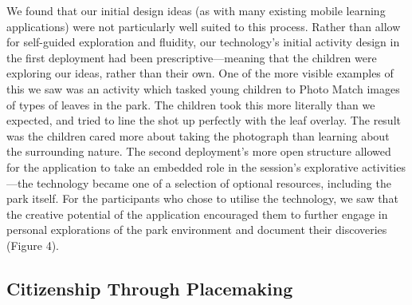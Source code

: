 We found that our initial design ideas (as with many existing mobile learning applications) were not particularly well suited to this process. Rather than allow for self-guided exploration and fluidity, our technology’s initial activity design in the first deployment had been prescriptive—meaning that the children were exploring our ideas, rather than their own. One of the more visible examples of this we saw was an activity which tasked young children to Photo Match images of types of leaves in the park. The children took this more literally than we expected, and tried to line the shot up perfectly with the leaf overlay. The result was the children cared more about taking the photograph than learning about the surrounding nature. The second deployment’s more open structure allowed for the application to take an embedded role in the session’s explorative activities—the technology became one of a selection of optional resources, including the park itself. For the participants who chose to utilise the technology, we saw that the creative potential of the application encouraged them to further engage in personal explorations of the park environment and document their discoveries (Figure 4).

\subsection{Citizenship Through Placemaking}

